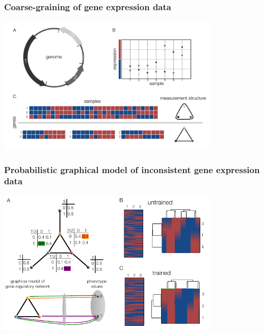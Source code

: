 

\begin{frame}
\vspace{1em}
\frametitle{Coarse-graining of gene expression data}
\begin{center}
\includegraphics[width=0.8\textwidth]{fig/figure_expression_concept.pdf}\\
\end{center}
\end{frame}

\begin{frame}
\vspace{1em}
\frametitle{Probabilistic graphical model of inconsistent gene expression data}
\begin{center}
\includegraphics[width=0.8\textwidth]{fig/inconsistentthreecycle.pdf}\\
\end{center}
\end{frame}


